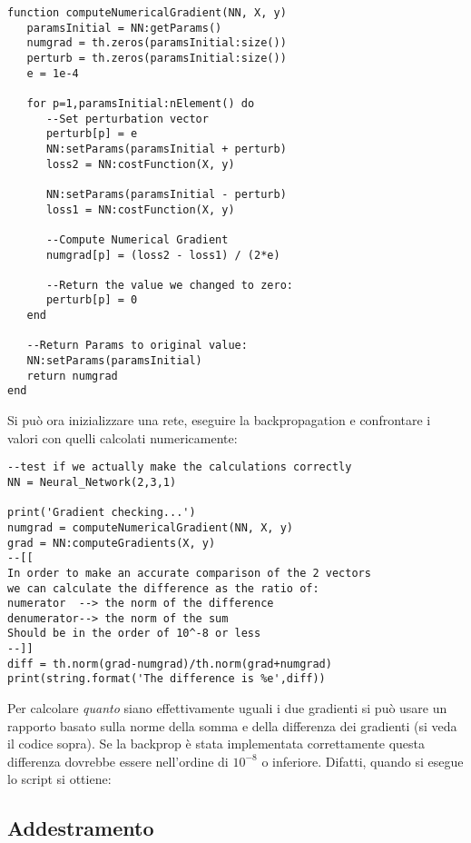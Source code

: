 \begin{lstlisting}[language={[5.2]Lua}]
function computeNumericalGradient(NN, X, y)
   paramsInitial = NN:getParams()
   numgrad = th.zeros(paramsInitial:size())
   perturb = th.zeros(paramsInitial:size())
   e = 1e-4

   for p=1,paramsInitial:nElement() do
      --Set perturbation vector
      perturb[p] = e
      NN:setParams(paramsInitial + perturb)
      loss2 = NN:costFunction(X, y)

      NN:setParams(paramsInitial - perturb)
      loss1 = NN:costFunction(X, y)

      --Compute Numerical Gradient
      numgrad[p] = (loss2 - loss1) / (2*e)

      --Return the value we changed to zero:
      perturb[p] = 0
   end

   --Return Params to original value:
   NN:setParams(paramsInitial)
   return numgrad
end
\end{lstlisting}
Si può ora inizializzare una rete, eseguire la backpropagation e confrontare i valori con quelli calcolati numericamente: 
\begin{lstlisting}[language={[5.2]Lua}]
--test if we actually make the calculations correctly
NN = Neural_Network(2,3,1)

print('Gradient checking...')
numgrad = computeNumericalGradient(NN, X, y)
grad = NN:computeGradients(X, y)
--[[
In order to make an accurate comparison of the 2 vectors
we can calculate the difference as the ratio of:
numerator  --> the norm of the difference
denumerator--> the norm of the sum
Should be in the order of 10^-8 or less
--]]
diff = th.norm(grad-numgrad)/th.norm(grad+numgrad)
print(string.format('The difference is %e',diff))
\end{lstlisting}

Per calcolare \emph{quanto} siano effettivamente uguali i due gradienti si può usare un rapporto basato sulla norme della somma e della differenza dei gradienti (si veda il codice sopra). Se la backprop è stata implementata correttamente questa differenza dovrebbe essere nell'ordine di $10^{-8}$ o inferiore. Difatti, quando si esegue lo script si ottiene: 



\subsection{Addestramento}


